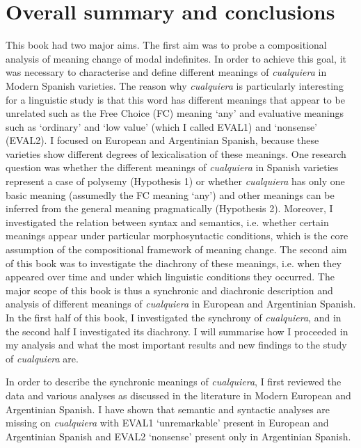 \chapter{Overall summary and conclusions}\label{sec:6}

This book had two major aims. The first aim was to probe a compositional analysis of meaning change of modal indefinites. In order to achieve this goal, it was necessary to characterise and define different meanings of \textit{cualquiera} in Modern Spanish varieties. The reason why \textit{cualquiera} is particularly interesting for a linguistic study is that this word has different meanings that appear to be unrelated such as the Free Choice (FC) meaning ‘any’ and evaluative meanings such as ‘ordinary’ and ‘low value’ (which I called EVAL1) and ‘nonsense’ (EVAL2). I focused on European and Argentinian Spanish, because these varieties show different degrees of lexicalisation of these meanings. One research question was whether the different meanings of \textit{cualquiera} in Spanish varieties represent a case of polysemy (Hypothesis 1) or whether \textit{cualquiera} has only one basic meaning (assumedly the FC meaning ‘any’) and other meanings can be inferred from the general meaning pragmatically (Hypothesis 2). Moreover, I investigated the relation between syntax and semantics, i.e. whether certain meanings appear under particular morphosyntactic conditions, which is the core assumption of the compositional framework of meaning change. The second aim of this book was to investigate the diachrony of these meanings, i.e. when 
they appeared over time and under which linguistic conditions they occurred. The major scope of this book is thus a synchronic and diachronic description and analysis of different meanings of \textit{cualquiera} in European and Argentinian Spanish. In the first half of this book, I investigated the synchrony of \textit{cualquiera}, and in the second half I investigated its diachrony. I will summarise how I proceeded in my analysis and what the most important results and new findings to the study of \textit{cualquiera} are.

  In order to describe the synchronic meanings of \textit{cualquiera}, I first reviewed the data and various analyses as discussed in the literature in Modern European and Argentinian Spanish. I have shown that semantic and syntactic analyses are missing on \textit{cualquiera} with EVAL1 ‘unremarkable’ present in European and Argentinian Spanish and EVAL2 ‘nonsense’ present only in Argentinian Spanish.

